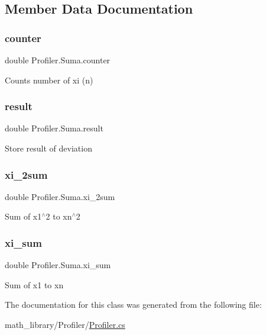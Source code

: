 \subsection{Member Data Documentation}
\mbox{\label{classProfiler_1_1Suma_a2cbdd09825bd90617b5f21962d8ff425}} 
\subsubsection{\texorpdfstring{counter}{counter}}
{\footnotesize\ttfamily double Profiler.\+Suma.\+counter}

Counts number of xi (n) \mbox{\label{classProfiler_1_1Suma_ae61cfef0fddb2f2e980120acefcbd522}} 
\subsubsection{\texorpdfstring{result}{result}}
{\footnotesize\ttfamily double Profiler.\+Suma.\+result}

Store result of deviation \mbox{\label{classProfiler_1_1Suma_ad555897c23ee47308cd9faebabd758ce}} 
\subsubsection{\texorpdfstring{xi\+\_\+2sum}{xi\_2sum}}
{\footnotesize\ttfamily double Profiler.\+Suma.\+xi\+\_\+2sum}

Sum of x1$^\wedge$2 to xn$^\wedge$2 \mbox{\label{classProfiler_1_1Suma_a517cdab6733ffb45242cad4f7cd1af1c}} 
\subsubsection{\texorpdfstring{xi\+\_\+sum}{xi\_sum}}
{\footnotesize\ttfamily double Profiler.\+Suma.\+xi\+\_\+sum}

Sum of x1 to xn 

The documentation for this class was generated from the following file\+:\begin{DoxyCompactItemize}
\item 
math\+\_\+library/\+Profiler/\hyperlink{Profiler_8cs}{Profiler.\+cs}\end{DoxyCompactItemize}
